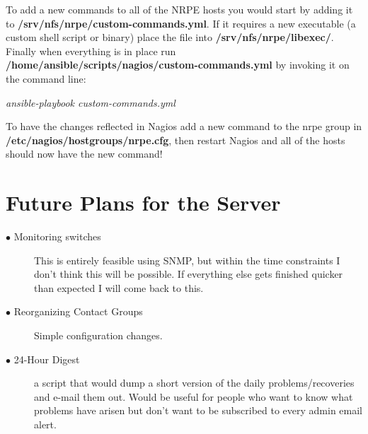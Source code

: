 \documentclass[a4paper]{article}
\begin{document}
To add a new commands to all of the NRPE hosts you would start by adding it to \textbf{/srv/nfs/nrpe/custom-commands.yml}. If it requires a new executable (a custom shell script or binary) place the file into \textbf{/srv/nfs/nrpe/libexec/}. Finally when everything is in place run \textbf{/home/ansible/scripts/nagios/custom-commands.yml} by invoking it on the command line:

\begin{center}
  \textit{ansible-playbook custom-commands.yml}
\end{center}

To have the changes reflected in Nagios add a new command to the nrpe group in \textbf{/etc/nagios/hostgroups/nrpe.cfg}, then restart Nagios and all of the hosts should now have the new command!

\section{Future Plans for the Server}
\begin{description}
  \item[$\bullet$ Monitoring switches] This is entirely feasible using SNMP, but within the time constraints I don't think this will be possible. If everything else gets finished quicker than expected I will come back to this.
  \item[$\bullet$ Reorganizing Contact Groups] Simple configuration changes. 
  \item[$\bullet$ 24-Hour Digest] a script that would dump a short version of the daily problems/recoveries and e-mail them out. Would be useful for people who want to know what problems have arisen but don't want to be subscribed to every admin email alert.
\end{description}
\end{document}
